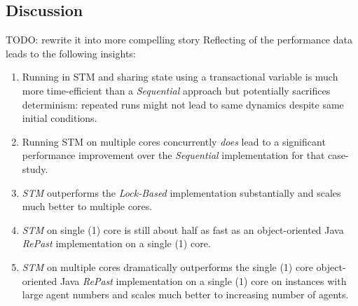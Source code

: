 %

\subsection{Discussion}
TODO: rewrite it into more compelling story
Reflecting of the performance data leads to the following insights:
\begin{enumerate}
	\item Running in STM and sharing state using a transactional variable is much more time-efficient than a \textit{Sequential} approach but potentially sacrifices determinism: repeated runs might not lead to same dynamics despite same initial conditions.
	\item Running STM on multiple cores concurrently \textit{does} lead to a significant performance improvement over the \textit{Sequential} implementation for that case-study.
	\item \textit{STM} outperforms the \textit{Lock-Based} implementation substantially and scales much better to multiple cores.
	\item \textit{STM} on single (1) core is still about half as fast as an object-oriented Java \textit{RePast} implementation on a single (1) core.
	\item \textit{STM} on multiple cores dramatically outperforms the single (1) core object-oriented Java \textit{RePast} implementation on a single (1) core on instances with large agent numbers and scales much better to increasing number of agents.
\end{enumerate}